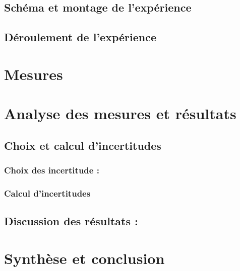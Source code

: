 \documentclass[12pt,a4paper]{article}
\begin{document}
    \subsection{Schéma et montage de l’expérience}
    \subsection{Déroulement de l'expérience}
    \section{Mesures}
    \section{Analyse des mesures et résultats}
    \subsection{Choix et calcul d'incertitudes}
    \subsubsection{Choix des incertitude :}
    \subsubsection{Calcul d'incertitudes}
    \subsection{Discussion des résultats :}
    \section{Synthèse et conclusion}
\end{document}
